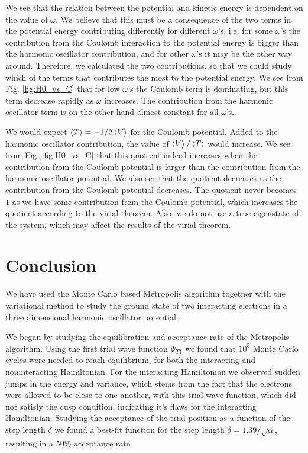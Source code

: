 \documentclass[%
 reprint,
nofootinbib,
aps,
]{revtex4-1}
\begin{document}
We see that the relation between the potential and kinetic energy is dependent on the value of $\omega$. We believe that this must be a consequence of the two terms in the potential energy contributing differently for different $\omega$'s, i.e. for some $\omega$'s the contribution from the Coulomb interaction to the potential energy is bigger than the harmonic oscillator contribution, and for other $\omega$'s it may be the other way around. Therefore, we calculated the two contributions, so that we could study which of the terms that contributes the most to the potential energy. We see from Fig. \ref{fig:H0_vs_C} that for low $\omega$'s the Coulomb term is dominating, but this term decrease rapidly as $\omega$ increases. The contribution from the harmonic oscillator term is on the other hand almost constant for all $\omega$'s.

We would expect $\ev{T} = -1/2 \ev{V}$ for the Coulomb potential. Added to the harmonic oscillator contribution, the value of $\ev{V}/\ev{T}$ would increase. We see from Fig. \ref{fig:H0_vs_C} that this quotient indeed increases when the contribution from the Coulomb potential is larger than the contribution from the harmonic oscillator potential. We also see that the quotient decreases as the contribution from the Coulomb potential decreases. The quotient never becomes $1$ as we have some contribution from the Coulomb potential, which increases the quotient according to the virial theorem. Also, we do not use a true eigenstate of the system, which may affect the results of the virial theorem.



\section{Conclusion}

We have used the Monte Carlo based Metropolis algorithm together with the variational method to study the ground state of two interacting electrons in a three dimensional harmonic oscillator potential.

We began by studying the equilibration and acceptance rate of the Metropolis algorithm. Using the first trial wave function $\Psi_{T1}$ we found that $10^5$ Monte Carlo cycles were needed to reach equilibrium, for both the interacting and noninteracting Hamiltonian. For the interacting Hamiltonian we observed sudden jumps in the energy and variance, which stems from the fact that the electrons were allowed to be close to one another, with this trial wave function, which did not satisfy the cusp condition, indicating it's flaws for the interacting Hamiltonian. Studying the acceptance of the trial position as a function of the step length $\delta$ we found a best-fit function for the step length $\delta = 1.39/\sqrt{\alpha}$, resulting in a $50\%$ acceptance rate.
\end{document}
